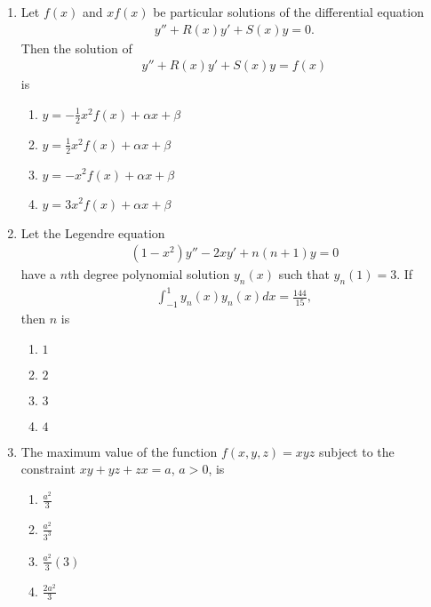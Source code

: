 \documentclass[journal]{IEEEtran}
\numberwithin{equation}{enumi}
\numberwithin{figure}{enumi}
\begin{document}
\begin{enumerate}
\item
Let $f(x)$ and $x f(x)$ be particular solutions of the differential equation
\begin{align}
y'' + R(x)y' + S(x)y = 0.
\end{align}
Then the solution of
\begin{align}
y'' + R(x) y' + S(x) y = f(x)
\end{align}
is
\hfill{}
\begin{multicols}{2}
\begin{enumerate}
\item $y = -\frac{1}{2} x^2 f(x) + \alpha x + \beta$
\item $y = \frac{1}{2} x^2 f(x) + \alpha x + \beta$
\item $y = - x^2 f(x) + \alpha x + \beta$
\item $y = 3 x^2 f(x) + \alpha x + \beta$
\end{enumerate}
\end{multicols}

\item
Let the Legendre equation
\begin{align}
(1 - x^2) y'' - 2x y' + n(n+1) y = 0
\end{align}
have a $n$th degree polynomial solution $y_n(x)$ such that $y_n(1) = 3$. If
\begin{align}
\int_{-1}^1 y_n(x) y_n(x) dx = \frac{144}{15},
\end{align}
then $n$ is
\hfill{}
\begin{multicols}{4}
\begin{enumerate}
\item $1$
\item $2$
\item $3$
\item $4$
\end{enumerate}
\end{multicols}

\item
The maximum value of the function $f(x,y,z) = xyz$ subject to the constraint $xy + yz + zx = a$, $a > 0$, is
\hfill{}
\begin{multicols}{4}
\begin{enumerate}
\item $\frac{a^2}{3}$
\item $\frac{a^2}{3^3}$
\item $\frac{a^2}{3}(3)$
\item $\frac{2 a^2}{3}$
\end{enumerate}
\end{multicols}


\end{enumerate}
\end{document}
